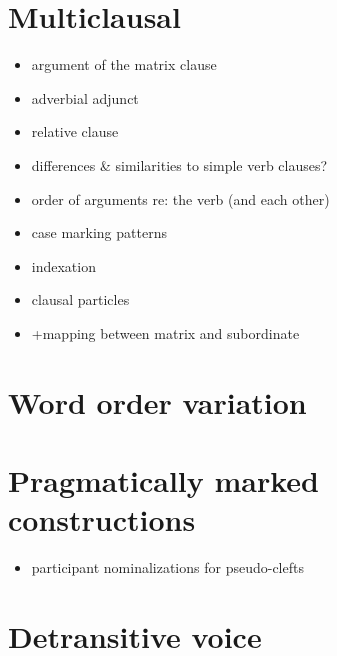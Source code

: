\documentclass{memoir}
\begin{document}
\chapter{\texorpdfstring{Multiclausal
\label{multiclausal}}{Multiclausal }}

\begin{itemize}
\item
  argument of the matrix clause
\item
  adverbial adjunct
\item
  relative clause
\item
  differences \& similarities to simple verb clauses?
\item
  order of arguments re: the verb (and each other)
\item
  case marking patterns
\item
  indexation
\item
  clausal particles
\item
  +mapping between matrix and subordinate
\end{itemize}

\chapter{\texorpdfstring{Word order variation
\label{wordorder}}{Word order variation }}

\chapter{\texorpdfstring{Pragmatically marked constructions
\label{pragmarked}}{Pragmatically marked constructions }}

\begin{itemize}
\tightlist
\item
  participant nominalizations for pseudo-clefts
\end{itemize}

\chapter{\texorpdfstring{Detransitive voice
\label{voice}}{Detransitive voice }}
\end{document}

